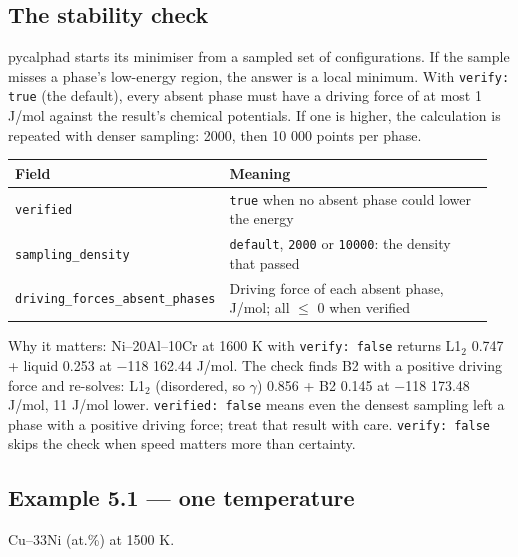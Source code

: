 \documentclass[12pt,a4paper]{article}
\begin{document}
\subsection*{The stability check}
pycalphad starts its minimiser from a sampled set of configurations. If the sample misses a phase's low-energy region, the answer is a local minimum. With \texttt{verify: true} (the default), every absent phase must have a driving force of at most 1 J/mol against the result's chemical potentials. If one is higher, the calculation is repeated with denser sampling: 2000, then 10 000 points per phase.

\begingroup\small
\begin{longtable}{>{\raggedright\arraybackslash}p{0.268\linewidth}>{\raggedright\arraybackslash}p{0.679\linewidth}}
\toprule
\textbf{Field} & \textbf{Meaning} \\
\midrule
\endhead
\texttt{verified} & \texttt{true} when no absent phase could lower the energy \\
\texttt{sampling\_\allowbreak{}density} & \texttt{\textquotedbl{}default\textquotedbl{}}, \texttt{2000} or \texttt{10000}: the density that passed \\
\texttt{driving\_\allowbreak{}forces\_\allowbreak{}absent\_\allowbreak{}phases} & Driving force of each absent phase, J/mol; all \(\le\) 0 when verified \\
\bottomrule
\end{longtable}
\endgroup
Why it matters: Ni--20Al--10Cr at 1600 K with \texttt{verify: false} returns L1\(_{2}\) 0.747 + liquid 0.253 at \(-\)118 162.44 J/mol. The check finds B2 with a positive driving force and re-solves: L1\(_{2}\) (disordered, so \(\gamma\)) 0.856 + B2 0.145 at \(-\)118 173.48 J/mol, 11 J/mol lower. \texttt{verified: false} means even the densest sampling left a phase with a positive driving force; treat that result with care. \texttt{verify: false} skips the check when speed matters more than certainty.


\subsection*{Example 5.1 --- one temperature}
Cu--33Ni (at.\%) at 1500 K.
\end{document}
